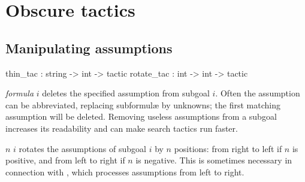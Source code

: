 \section{Obscure tactics}

\subsection{Manipulating assumptions}
\begin{ttbox} 
thin_tac   : string -> int -> tactic
rotate_tac : int -> int -> tactic
\end{ttbox}
\begin{ttdescription}
\item[\ttindexbold{thin_tac} {\it formula} $i$]  
deletes the specified assumption from subgoal $i$.  Often the assumption
can be abbreviated, replacing subformul{\ae} by unknowns; the first matching
assumption will be deleted.  Removing useless assumptions from a subgoal
increases its readability and can make search tactics run faster.

\item[\ttindexbold{rotate_tac} $n$ $i$]  
rotates the assumptions of subgoal $i$ by $n$ positions: from right to left
if $n$ is positive, and from left to right if $n$ is negative.  This is 
sometimes necessary in connection with , which 
processes assumptions from left to right.
\end{ttdescription}


